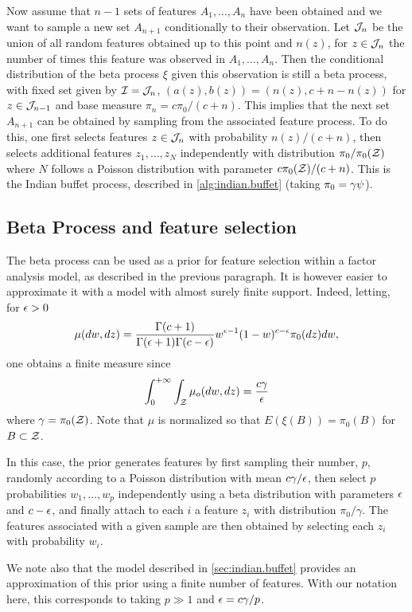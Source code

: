Now assume that $n-1$ sets of features $A_1, \ldots, A_{n}$ have been obtained and we want to sample a new set $A_{n+1}$ conditionally to their observation. Let ${\mathcal J}_{n}$ be the union of all random features obtained up to this point and $n(z)$, for $z\in {\mathcal J}_{n}$ the number of times this feature was observed in $A_1, \ldots, A_{n}$. 
Then the conditional distribution of the beta process $\xi$ given this observation is still a beta process, with fixed set given by
${\mathcal I} = {\mathcal J}_{n}$,  $(a(z), b(z)) = (n(z), c+n - n(z))$ for $z\in {\mathcal J}_{n-1}$ and base measure $\pi_{n} = c\pi_0/(c+n)$. This implies that the next set $A_{n+1}$ can be obtained by sampling from the associated feature process. To do this, one first selects features $z\in {\mathcal J}_n$ with probability $n(z)/(c+n)$, then selects additional features $z_1, \ldots, z_N$ independently with distribution  $\pi_0/\pi_0({\mathcal Z})$ where $N$ follows a Poisson distribution with parameter $c\pi_0({\mathcal Z})/(c+n)$. 
This is the Indian buffet process, described in  \cref{alg:indian.buffet} (taking  $\pi_0 = \gamma \psi$).



\subsection{Beta Process and feature selection}
The beta process can be used as a prior for feature selection within a factor analysis model, as described in the previous paragraph. It is however easier to approximate it with a model with almost surely finite support. Indeed, letting, for $\epsilon >0$
\[
\mu(dw, dz) = \frac{\Gamma(c + 1)}{\Gamma(\epsilon+1)\Gamma(c-\epsilon)} w^{\epsilon - 1} (1-w)^{c-\epsilon} \pi_0(dz) dw,
\]
one obtains a finite measure since
\[
\int_0^{+\infty} \int_{{\mathcal Z}} \mu_o(dw, dz) = \frac{c\gamma}{\epsilon}
\]
where $\gamma = \pi_0({\mathcal Z})$. Note that $\mu$ is normalized so that $E(\xi(B)) = \pi_0(B)$ for $B\subset {\mathcal Z}$. 

In this case, the prior generates features by first sampling their number, $p$, randomly according to  a Poisson distribution with mean $c\gamma/\epsilon$, then select $p$ probabilities  $w_1, \ldots, w_p$ independently using a beta distribution with parameters $\epsilon$ and $c-\epsilon$, and finally attach to each $i$ a feature $z_i$ with  distribution $\pi_0/\gamma$. The features associated with a given sample are then obtained by selecting each $z_i$ with probability $w_i$.

We note also that the model described in \cref{sec:indian.buffet} provides an approximation of this prior using a  finite number of features. With our notation here, this corresponds to taking $p\gg 1$ and $\epsilon = c\gamma/p$. 










